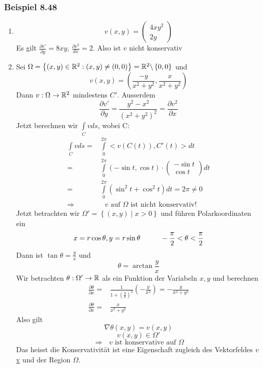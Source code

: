 \subsubsection*{Beispiel 8.48}
\begin{enumerate}
\item \[v\left( {x,y} \right) = \left( {\begin{array}{*{20}{c}}
{4x{y^2}}\\
{2y}
\end{array}} \right)\]
Es gilt $\frac{\partial v'}{\partial y}=8xy$, $\frac{\partial v^2}{dx}=2$. Also ist $v$ nicht konservativ
\item Sei $\Omega = \left\{ \left( x,y\right) \in\mathbb{R}^2:\left( x,y\right) \not= (0,0) \right\} = \mathbb{R}^2\backslash\left\{ 0,0\right\}$ und \[v(x,y) = \left( {\frac{{ - y}}{{{x^2} + {y^2}}},\frac{x}{{{x^2} + {y^2}}}} \right)\] Dann $v:\Omega \to\mathbb{R}^2$ mindestens $C'$. Ausserdem \[\frac{{\partial v'}}{{\partial y}} = \frac{{{y^2} - {x^2}}}{{{{\left( {{x^2} + {y^2}} \right)}^2}}} = \frac{{\partial {v^2}}}{{\partial x}}\] Jetzt berechnen wir $\int\limits_C v ds$, wobei C:
\begin{align*}
\int\limits_C vds  = & \int\limits_0^{2\pi } { < v\left( {C\left( t \right)} \right),C'\left( t \right) > dt} \\
= & \int\limits_0^{2\pi } \left( -\sin t,\cos t\right)\cdot  \left( {\begin{array}{*{20}{c}}
{ - \sin t}\\
{\cos t}
\end{array}} \right) dt\\
= & \int\limits_0^{2\pi } \left( \sin^2 t+\cos^2 t\right) dt=2\pi\not= 0\\
\Rightarrow &\text{ $v$ auf $\Omega$ ist nicht konservativ!}
\end{align*}
Jetzt betrachten wir $\Omega'=\left\{ \left( x,y\right) \mid x>0 \right\}$  und führen Polarkoordinaten ein \[x=r\cos\theta, y=r\sin\theta\hspace{10mm} -\frac{\pi}{2}<\theta <\frac{\pi}{2}\]
Dann ist $\tan\theta = \frac{y}{x}$ und \[\theta=\arctan\frac{y}{x}\]
Wir betrachten $\theta:\Omega'\to\mathbb{R}$ als ein Funktion der Variabeln $x,y$ und berechnen
\begin{align*}
\frac{{\partial \theta }}{{\partial x}} = & \frac{1}{{1 + {{\left( {\frac{y}{x}} \right)}^2}}}\left( { - \frac{y}{{{x^2}}}} \right) =  - \frac{y}{{{x^2} + {y^2}}}\\
\frac{{\partial \theta }}{{\partial x}} = & \frac{x}{{{x^2} + {y^2}}}
\end{align*}
Also gilt
\[\nabla \theta\left( x,y\right) = v\left( x,y\right)\]
\[v\left( x,y\right) \in\Omega'\]
$$\Rightarrow\text{ $v$ ist konservative auf $\Omega$}$$
Das heisst die Konservativität ist eine Eigenschaft zugleich des Vektorfeldes $v$ \underline{v} und der Region $\Omega$.
\end{enumerate}


